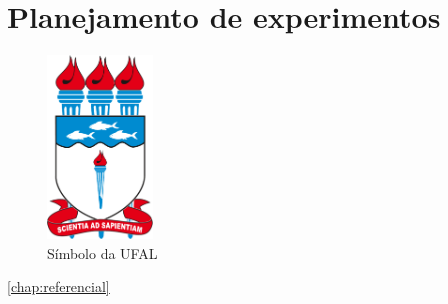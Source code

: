\chapter{Planejamento de experimentos}
\label{chap:doe}

\begin{figure}[!hbt]
	\centering
	\caption{Símbolo da UFAL}
	\label{fig:1_possuem_celular}
	\includegraphics[width=0.25\textwidth]{imagens/ufal}
\end{figure}

\ref{chap:referencial}